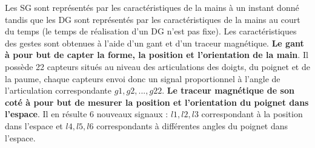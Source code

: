 \documentclass[12pt,a4paper,roman]{article}
\begin{document}
Les SG sont représentés par les caractéristiques de la mains à un instant donné tandis que les DG sont représentés par les caractéristiques de la mains au court du temps (le temps de réalisation d'un DG n'est pas fixe).
\newline
Les caractéristiques des gestes sont obtenues à l'aide d'un gant et d'un traceur magnétique. \textbf{Le gant à pour but de capter la forme, la position et l'orientation de la main}. Il possède 22 capteurs situés au niveau des articulations des doigts, du poignet et de la paume, chaque capteurs envoi donc un signal proportionnel à l'angle de l'articulation correspondante $g1, g2, ..., g22$.
\newline
\textbf{Le traceur magnétique de son coté à pour but de mesurer la position et l'orientation du poignet dans l'espace}. Il en résulte 6 nouveaux signaux : $l1, l2, l3$ correspondant à la position dans l'espace et $l4, l5, l6$ correspondants à différentes angles du poignet dans l'espace. 











\end{document}
